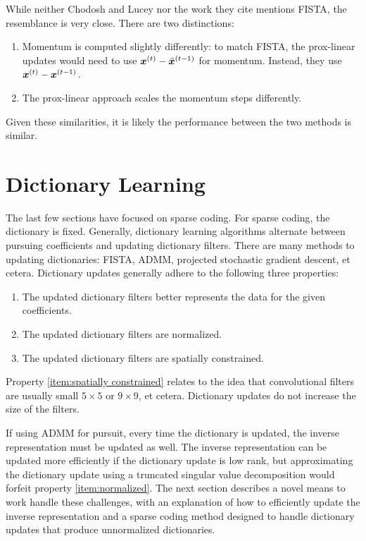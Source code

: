 While neither Chodosh and Lucey nor the work they cite mentions FISTA, the resemblance is very close. There are two distinctions:
\begin{enumerate}
\item Momentum is computed slightly differently: to match FISTA, the prox-linear updates would need to use $\bm{x}^{(t)} - \bar{\bm{x}}^{(t - 1)}$ for momentum. Instead, they use $\bm{x}^{(t)} - \bm{x}^{(t - 1)}$.
\item The prox-linear approach scales the momentum steps differently.
\end{enumerate}

Given these similarities, it is likely the performance between the two methods is similar.

\section{Dictionary Learning}
The last few sections have focused on sparse coding. For sparse coding, the dictionary is fixed. Generally, dictionary learning algorithms alternate between pursuing coefficients and updating dictionary filters. There are many methods to updating dictionaries: FISTA, ADMM, projected stochastic gradient descent, et cetera. Dictionary updates generally adhere to the following three properties:
\begin{enumerate}
\item The updated dictionary filters better represents the data for the given coefficients.\label{item:improvement property}
\item The updated dictionary filters are normalized.\label{item:normalized}
\item The updated dictionary filters are spatially constrained. \label{item:spatially constrained}
\end{enumerate}
Property \ref{item:spatially constrained} relates to the idea that convolutional filters are usually small $5 \times 5$ or $9 \times 9$, et cetera. Dictionary updates do not increase the size of the filters.

If using ADMM for pursuit, every time the dictionary is updated, the inverse representation must be updated as well. The inverse representation can be updated more efficiently if the dictionary update is low rank, but approximating the dictionary update using a truncated singular value decomposition would forfeit property \ref{item:normalized}. The next section describes a novel means to work handle these challenges, with an explanation of how to efficiently update the inverse representation and a sparse coding method designed to handle dictionary updates that produce unnormalized dictionaries.

